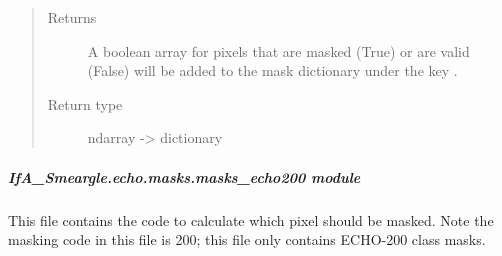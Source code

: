 \documentclass[letterpaper,10pt,english]{sphinxmanual}
\begin{document}
\begin{fulllineitems}
\begin{quote}
\begin{description}
\begin{itemize}
\end{itemize}

\item[{Returns}] \leavevmode
{} \textendash{} A boolean array for pixels that are masked (True) or are valid
(False) will be added to the mask dictionary under the
key .

\item[{Return type}] \leavevmode
ndarray -\textgreater{} dictionary

\end{description}\end{quote}

\end{fulllineitems}



\subparagraph{IfA\_Smeargle.echo.masks.masks\_echo200 module}
\label{\detokenize{python_docstrings/IfA_Smeargle.echo.masks.masks_echo200:module-IfA_Smeargle.echo.masks.masks_echo200}}\label{\detokenize{python_docstrings/IfA_Smeargle.echo.masks.masks_echo200:ifa-smeargle-echo-masks-masks-echo200-module}}\label{\detokenize{python_docstrings/IfA_Smeargle.echo.masks.masks_echo200::doc}}
This file contains the code to calculate which pixel should be masked. Note the masking code
in this file is 200; this file only contains ECHO-200 class masks.
\end{document}
